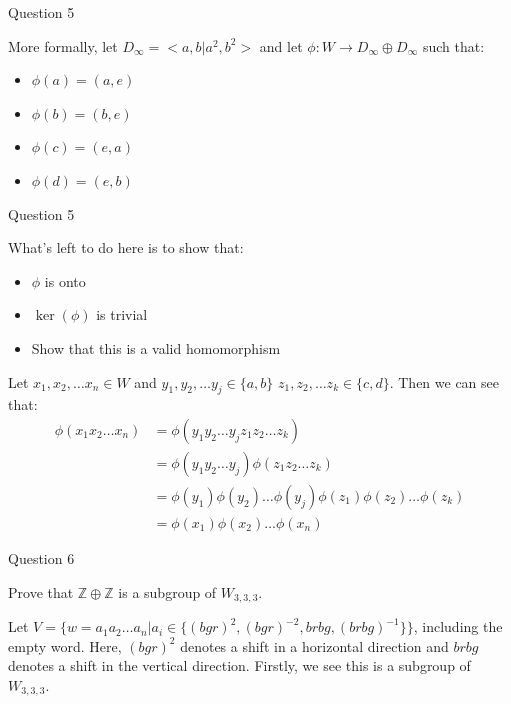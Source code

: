 \documentclass[usenames,dvipsnames]{beamer}
\newcommand{\Z}{\mathbb{Z}}
\begin{document}
\begin{frame}{Question 5}

More formally, let $D_\infty=<a,b|a^2,b^2>$ and let $\phi:W\rightarrow D_\infty \oplus D_\infty$ such that:

 \pause{}

\begin{itemize}
  \item $\phi(a)=(a,e)$
  \item $\phi(b)=(b,e)$
  \item $\phi(c)=(e,a)$
  \item $\phi(d)=(e,b)$
\end{itemize}

\end{frame}

\begin{frame}{Question 5}

What's left to do here is to show that:

\begin{itemize}
\item $\phi$ is onto
\item $\ker(\phi)$ is trivial
\item Show that this is a valid homomorphism
\end{itemize}

Let $x_1,x_2, \ldots x_n \in W$ and  $y_1,y_2, \ldots y_j\in \{a,b\}$ $z_1,z_2, \ldots z_k\in \{c,d\}$.
Then we can see that:
\begin{align*}
\phi(x_1x_2 \ldots x_n)
&=\phi(y_1y_2 \ldots y_{j}z_{1}z_{2} \ldots z_k)\\
&=\phi(y_1y_2 \ldots y_j)\phi(z_1z_2 \ldots z_k)\\
&=\phi(y_1)\phi(y_2) \ldots \phi(y_j)\phi(z_1)\phi(z_2) \ldots \phi(z_k)\\
&=\phi(x_1)\phi(x_2) \ldots \phi(x_n)
\end{align*}
\end{frame}

\begin{frame}{Question 6}

Prove that $\Z \oplus \Z$ is a subgroup of $W_{3,3,3}$.\\

\pause{}

Let $V=\{w={a_1a_2\ldots a_n} | a_i\in\{(bgr)^2,(bgr)^{-2},brbg,(brbg)^{-1}\}\}$, including the empty word.
Here, $(bgr)^2$ denotes a shift in a horizontal direction and $brbg$ denotes a shift in the vertical
direction. Firstly, we see this is a subgroup of $W_{3,3,3}$.

\end{frame}
\end{document}
